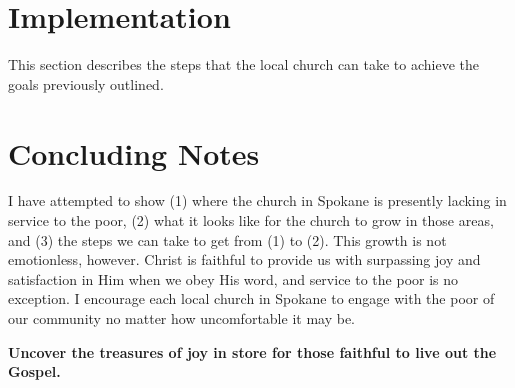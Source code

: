 \documentclass[12pt]{article}
\begin{document}
\section{Implementation}

This section describes the steps that the local church can take to achieve the goals previously outlined.




\section{Concluding Notes}

    \qChristianHedonism
    I have attempted to show (1) where the church in Spokane is presently lacking in service to the poor, (2) what it looks like for the church to grow in those areas, and (3) the steps we can take to get from (1) to (2).
    This growth is not emotionless, however.
    Christ is faithful to provide us with surpassing joy and satisfaction in Him when we obey His word, and service to the poor is no exception.
    I encourage each local church in Spokane to engage with the poor of our community no matter how uncomfortable it may be.
    \par \textbf{Uncover the treasures of joy in store for those faithful to live out the Gospel.}
    \qJohnEdwardsJoy

\clearpage
{}

\end{document}

